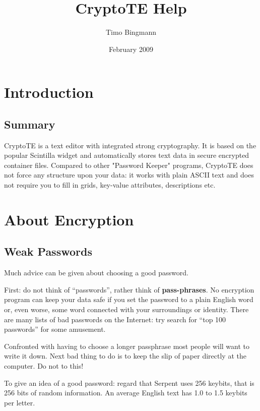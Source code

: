 \documentclass[a4paper,12pt,twoside]{article}
\title{CryptoTE Help}
\author{Timo Bingmann}
\date{February 2009}
\begin{document}
\pagestyle{plain}
\maketitle
\tableofcontents

\clearpage
\pagestyle{fancy}

\section{Introduction}\label{Introduction}

\subsection{Summary}\label{Summary}

CryptoTE is a text editor with integrated strong cryptography. It is based on
the popular Scintilla widget and automatically stores text data in secure
encrypted container files. Compared to other "Password Keeper" programs,
CryptoTE does not force any structure upon your data: it works with plain ASCII
text and does not require you to fill in grids, key-value attributes,
descriptions etc.

\section{About Encryption}\label{AboutEncryption}

\subsection{Weak Passwords}\label{WeakPasswords}

Much advice can be given about choosing a good password.

First: do not think of ``passwords'', rather think of \textbf{pass-phrases}. No encryption program can keep your data safe if you set the password to a plain English word or, even worse, some word connected with your surroundings or identity. There are many lists of bad passwords on the Internet: try search for ``top 100 passwords'' for some amusement.

Confronted with having to choose a longer passphrase most people will want to write it down. Next bad thing to do is to keep the slip of paper directly at the computer. Do not to this!

To give an idea of a good password: regard that Serpent uses 256 keybits, that is 256 bits of random information. An average English text has 1.0 to 1.5 keybits per letter.
\end{document}

